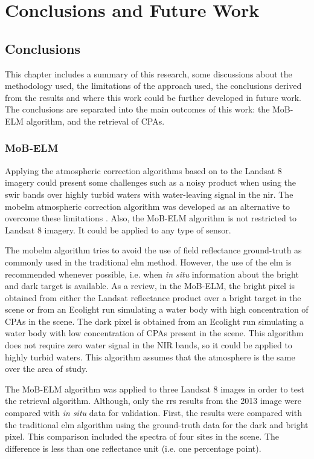 \chapter{Conclusions and Future Work}
\label{ch:conc_future}
\section{Conclusions}
\label{sec:conc}
This chapter includes a summary of this research, some discussions about the methodology used, the limitations of the approach used, the conclusions derived from the results and where this work could be further developed in future work. The conclusions are separated into the main outcomes of this work: the MoB-ELM algorithm, and the retrieval of CPAs.


\subsection{MoB-ELM}
Applying the atmospheric correction algorithms based on \citet{Gordon:1994} to the Landsat 8 imagery could present some challenges such as a noisy product when using the \gls{swir} bands over highly turbid waters with water-leaving signal in the \gls{nir}. The \gls{mobelm} atmospheric correction algorithm was developed as an alternative to overcome these limitations \citep{Concha2014SPIE}. Also, the MoB-ELM algorithm is not restricted to Landsat 8 imagery. It could be applied to any type of sensor.

The \gls{mobelm} algorithm tries to avoid the use of field reflectance ground-truth as commonly used in the traditional \gls{elm} method. However, the use of the \gls{elm} is recommended whenever possible, i.e. when {\it in situ} information about the bright and dark target is available. As a review, in the MoB-ELM, the bright pixel is obtained from either the Landsat reflectance product over a bright target in the scene or from an Ecolight run simulating a water body with high concentration of CPAs in the scene. The dark pixel is obtained from an Ecolight run simulating a water body with low concentration of CPAs present in the scene. This algorithm does not require zero water signal in the NIR bands, so it could be applied to highly turbid waters. This algorithm assumes that the atmosphere is the same over the area of study.

The MoB-ELM algorithm was applied to three Landsat 8 images in order to test the retrieval algorithm. Although, only the \gls{rrs} results from the 2013 image were compared with {\it in situ} data for validation. First, the results were compared with the traditional \gls{elm} algorithm using the ground-truth data for the dark and bright pixel. This comparison included the spectra of four sites in the scene. The difference is less than one reflectance unit (i.e. one percentage point). 

